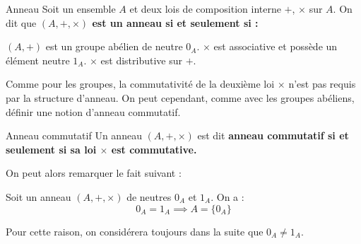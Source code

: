 \documentclass[a4paper,french,bookmarks]{article}
\begin{document}
\begin{definition}{Anneau}{}
    Soit un ensemble $A$ et deux lois de composition interne $+$, $\times$ sur $A$. On dit que \bf{$(A, +, \times)$ est un anneau} si et seulement si :
    \begin{enumerate}
        \ithand $(A, +)$ est un groupe abélien de neutre $0_A$.
        \ithand $\times$ est associative et possède un élément neutre $1_A$.
        \ithand \times $\times$ est distributive sur $+$. 
    \end{enumerate}
\end{definition}

Comme pour les groupes, la commutativité de la deuxième loi $\times$ n'est pas requis par la structure d'anneau. On peut cependant, comme avec les groupes abéliens, définir une notion d'anneau commutatif.

\begin{definition}{Anneau commutatif}{}
    Un anneau $(A, +, \times)$ est dit \bf{anneau commutatif} si et seulement si sa loi $\times$ est commutative.
\end{definition}

On peut alors remarquer le fait suivant :
\begin{property}{}{}
    Soit un anneau $(A, +, \times)$ de neutres $0_A$ et $1_A$. On a :
    \[ 0_A = 1_A \implies A = \{ 0_A \}\]
\end{property}


Pour cette raison, on considérera toujours dans la suite que $0_A \neq 1_A$.
\end{document}
